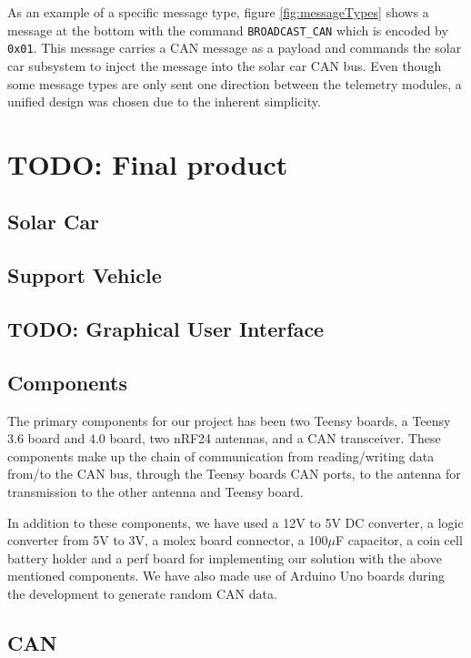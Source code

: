 \documentclass[conference]{IEEEtran}
\newcommand{\todo}[1]{{\color{olive} TODO: #1}}
\begin{document}
As an example of a specific message type, figure \ref{fig:messageTypes} shows a message at the bottom with the command \texttt{BROADCAST\_CAN} which is encoded by \texttt{0x01}. This message carries a CAN message as a payload and commands the solar car subsystem to inject the message into the solar car CAN bus. Even though some message types are only sent one direction between the telemetry modules, a unified design was chosen due to the inherent simplicity.





\section{\todo{Final product}}
\subsection{Solar Car}
\subsection{Support Vehicle}
\subsection{\todo{Graphical User Interface}}


\subsection{Components}
The primary components for our project has been two Teensy boards, a Teensy 3.6 board and 4.0 board, two nRF24 antennas, and a CAN transceiver. These components make up the chain of communication from reading/writing data from/to the CAN bus, through the Teensy boards CAN ports, to the antenna for transmission to the other antenna and Teensy board.

In addition to these components, we have used a 12V to 5V DC converter, a logic converter from 5V to 3V, a molex board connector, a 100\(\mu\)F capacitor, a coin cell battery holder and a perf board for implementing our solution with the above mentioned components. We have also made use of Arduino Uno boards during the development to generate random CAN data.


\subsection{CAN} %
\end{document}

